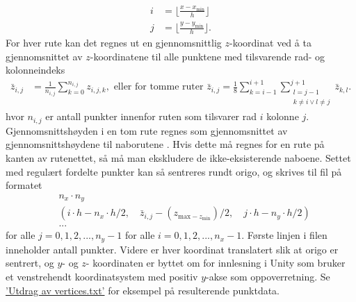 \documentclass[norsk, doc, 11pt, a4paper]{apa7}  %
\begin{document}
\begin{align*}
	i &= \lfloor \frac{x - x_{\text{min}}}{h} \rfloor \\
	j &= \lfloor \frac{y - y_{\text{min}}}{h} \rfloor.
\end{align*}
For hver rute kan det regnes ut en gjennomsnittlig \(z\)-koordinat ved å ta gjennomsnittet av \(z\)-koordinatene til alle punktene med tilsvarende rad- og kolonneindeks
\begin{align*}
	\bar{z}_{i,j} &= \frac{1}{n_{i,j}}\sum_{k = 0}^{n_{i,j}}z_{i,j,k},\text{ eller for tomme ruter }
	\bar{z}_{i,j} = \frac{1}{8}\sum_{k=i-1}^{i+1}\sum_{\substack{l=j-1 \\ k\neq i \lor l\neq j}}^{j+1} \bar{z}_{k,l}.
\end{align*}
hvor \(n_{i,j}\) er antall punkter innenfor ruten som tilsvarer rad \(i\) kolonne \(j\). Gjennomsnittshøyden i en tom rute regnes som gjennomsnittet av gjennomsnittshøydene til naborutene \parencite[ss.140-141]{nylundMAT301MatematikkIII2023}.
Hvis dette må regnes for en rute på kanten av rutenettet, så må man ekskludere de ikke-eksisterende naboene.
Settet med regulært fordelte punkter kan så sentreres rundt origo, og skrives til fil på formatet
\begin{align*}
	&n_{x}\cdot n_{y} \\
	&(i\cdot h - n_{x}\cdot h/2,\quad \bar{z}_{i,j} - (z_{\text{max} - z_{\text{min}}})/2,\quad j\cdot h - n_{y}\cdot h/2) \\
	&...
\end{align*}
for alle \(j=0,1,2,...,n_{y}-1\) for alle \(i=0,1,2,...,n_{x}-1\). Første linjen i filen inneholder antall punkter. Videre er hver koordinat translatert slik at origo er sentrert, og \(y\)- og \(z\)- koordinaten er byttet om for innlesning i Unity \parencite{UnityEngine2023} som bruker et venstrehendt koordinatsystem med positiv \(y\)-akse som oppoverretning. Se \hyperref[ap:vert]{'Utdrag av vertices.txt'} for eksempel på resulterende punktdata.
\end{document}

